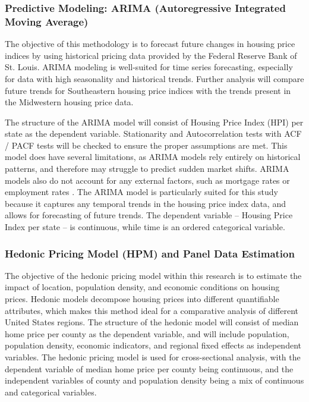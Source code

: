 \documentclass[journal,article,submit,pdftex,moreauthors]{Definitions/mdpi}
\begin{document}
\subsubsection{Predictive Modeling: ARIMA (Autoregressive Integrated Moving Average)}

The objective of this methodology is to forecast future changes in housing price indices by using historical pricing data provided by the Federal Reserve Bank of St. Louis. ARIMA modeling is well-suited for time series forecasting, especially for data with high seasonality and historical trends. Further analysis will compare future trends for Southeastern housing price indices with the trends present in the Midwestern housing price data.

The structure of the ARIMA model will consist of Housing Price Index (HPI) per state as the dependent variable. Stationarity and Autocorrelation tests with ACF / PACF tests will be checked to ensure the proper assumptions are met. This model does have several limitations, as ARIMA models rely entirely on historical patterns, and therefore may struggle to predict sudden market shifts. ARIMA models also do not account for any external factors, such as mortgage rates or employment rates \citep{liu_2024_navigating}. The ARIMA model is particularly suited for this study because it captures any temporal trends in the housing price index data, and allows for forecasting of future trends. The dependent variable – Housing Price Index per state – is continuous, while time is an ordered categorical variable.

\subsubsection{Hedonic Pricing Model (HPM) and Panel Data Estimation}

The objective of the hedonic pricing model within this research is to estimate the impact of location, population density, and economic conditions on housing prices. Hedonic models decompose housing prices into different quantifiable attributes, which makes this method ideal for a comparative analysis of different United States regions. The structure of the hedonic model will consist of median home price per county as the dependent variable, and will include population, population density, economic indicators, and regional fixed effects as independent variables. The hedonic pricing model is used for cross-sectional analysis, with the dependent variable of median home price per county being continuous, and the independent variables of county and population density being a mix of continuous and categorical variables.
\end{document}
